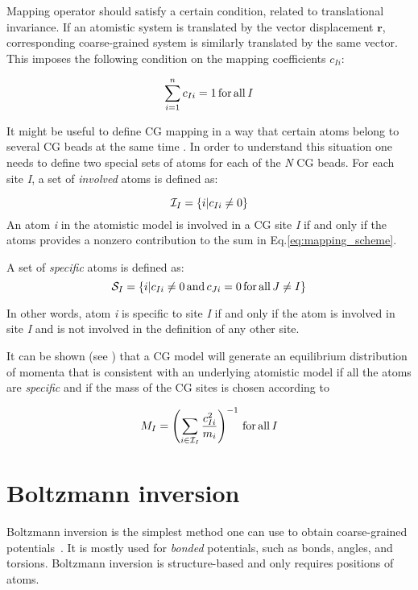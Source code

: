 Mapping operator should satisfy a certain condition, related to translational invariance. If an atomistic system is translated by the vector displacement $\bm r $, corresponding coarse-grained system is similarly translated by the same vector. This imposes the following condition on the mapping coefficients $ c_{Ii} $:

\begin{equation}
 \sum_{i=1}^{n}c_{Ii}=1\, \rm for\, all\, \it I
\end{equation}

It might be useful to define CG mapping in a way that certain atoms belong to several CG beads at the same time \cite{Fritz:2009}.
In order to understand this situation one needs to define two special sets of atoms for each of the {\it N} CG beads. For each site {\it I}, a set of {\it involved} atoms is defined as:

\begin{equation}
 {\cal I}_I=\{i|c_{Ii}\ne0\}
\end{equation}
An atom {\it i} in the atomistic model is involved in a CG site {\it I} if and only if the atoms provides a nonzero contribution to the sum in Eq.\ref{eq:mapping_scheme}.

A set of {\it specific} atoms is defined as:
\begin{equation}
 {\cal S}_I=\{i|c_{Ii}\ne0\, {\rm and}\, c_{Ji}=0\, {\rm for\,all}\, J\ne I\}
\end{equation}

In other words, atom {\it i} is specific to site {\it I} if and only if the atom is involved in site {\it I} and is not involved in the definition of any other site.

It can be shown (see \cite{Noid:2008.1}) that a CG model will generate an equilibrium distribution of momenta that is consistent with an underlying atomistic model if all the atoms are {\it specific} and if the mass of the CG sites is chosen according to

\begin{equation}
M_I= \left( \sum_{i \in {\cal I}_I}\frac{c_{Ii}^2}{m_i} \right)^{-1}\, \rm for\, all\, {\it I}
\end{equation}

\section{Boltzmann inversion}
\label{sec:bi}

Boltzmann inversion is the simplest method one can use to obtain coarse-grained potentials~\cite{Tschoep:1998}. It is mostly used for {\em bonded} potentials, such as bonds, angles, and torsions. Boltzmann inversion is structure-based and only requires positions of atoms.

